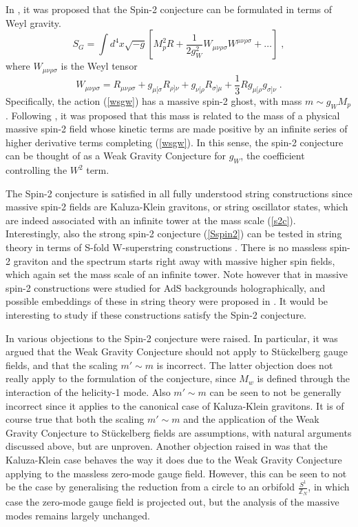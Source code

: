 \documentclass[11pt,a4paper]{article}
\numberwithin{equation}{section}
\numberwithin{table}{section}\setlength{\multlinegap}{25pt}
\begin{document}
{In \cite{Klaewer:2018yxi}, it was proposed that the Spin-2 conjecture can be formulated in terms of Weyl gravity.
\begin{equation}
\label{wsgw}
S_G =   \int d^4x \sqrt{-g} \left[ M_p^2 R + \frac{1}{2g_W^2}W_{\mu\nu\rho\sigma}W^{\mu\nu\rho\sigma} + \dots \right] \;,
\end{equation}
where  $W_{\mu\nu\rho\sigma}$ is the Weyl tensor
\begin{equation}
W_{\mu\nu\rho\sigma} = R_{\mu\nu\rho\sigma} + g_{\mu[\sigma}R_{\rho]\nu} + g_{\nu[\rho}R_{\sigma]\mu} + \frac13 R g_{\mu[\rho}g_{\sigma]\nu} \;. \nonumber
\end{equation} 
Specifically, the action (\ref{wsgw}) has a massive spin-2 ghost, with mass $m \sim g_W M_p$. Following \cite{Gording:2018not,Ferrara:2018wqd,Ferrara:2018wlb}, it was proposed that this mass is related to the mass of a physical massive spin-2 field whose kinetic terms are made positive by an infinite series of higher derivative terms completing (\ref{wsgw}). In this sense, the spin-2 conjecture can be thought of as a Weak Gravity Conjecture for $g_W$, the coefficient controlling the $W^2$ term. 

The Spin-2 conjecture is satisfied in all fully understood string constructions since massive spin-2 fields are Kaluza-Klein gravitons, or string oscillator states, which are indeed associated with an infinite tower at the mass scale (\ref{s2c}). Interestingly, also the strong spin-2 conjecture (\ref{Sspin2}) can be tested in string theory in terms of S-fold W-superstring constructions  \cite{Ferrara:2018iko}. There is no massless spin-2 graviton and the spectrum starts right away with massive higher spin fields, which again set the mass scale of an infinite tower. Note however that in \cite{Kiritsis:2006hy,Aharony:2006hz} massive spin-2 constructions were studied for AdS backgrounds holographically, and possible embeddings of these in string theory were proposed in \cite{Bachas:2017rch,Bachas:2018zmb}. It would be interesting to study if these constructions satisfy the Spin-2 conjecture.

In \cite{deRham:2018dqm} various objections to the Spin-2 conjecture were raised. In particular, it was argued that the Weak Gravity Conjecture should not apply to St\"uckelberg gauge fields, and that the scaling $m' \sim m$ is incorrect. The latter objection does not really apply to the formulation of the conjecture, since $M_w$ is defined through the interaction of the helicity-1 mode. Also $m' \sim m$  can be seen to not be generally incorrect since it applies to the canonical case of Kaluza-Klein gravitons. It is of course true that both the scaling $m' \sim m$  and the application of the Weak Gravity Conjecture to St\"uckelberg fields are assumptions, with natural arguments discussed above, but are unproven. Another objection raised in \cite{deRham:2018dqm} was that the Kaluza-Klein case behaves the way it does due to the Weak Gravity Conjecture applying to the massless zero-mode gauge field. However, this can be seen to not be the case by generalising the reduction from a circle to an orbifold $\frac{S^1}{\mathbb{Z}_N}$, in which case the zero-mode gauge field is projected out, but the analysis of the massive modes remains largely unchanged. 

}
\end{document}
